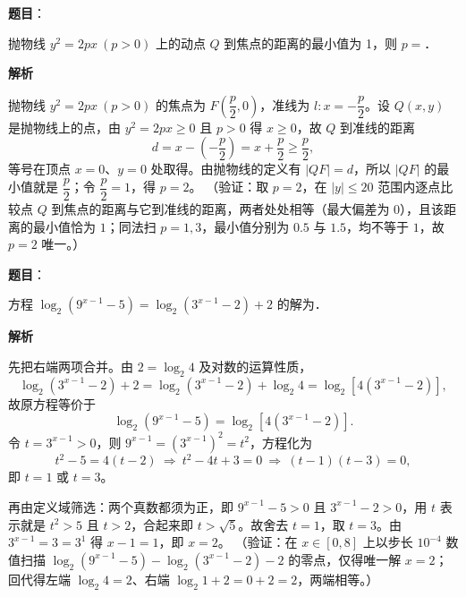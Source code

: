 \begin{answer}

\textbf{题目}：

抛物线 \(y^{2}=2px\ (p>0)\) 上的动点 \(Q\) 到焦点的距离的最小值为 1，则 \(p=\)\gkblank{}．

\textbf{解析}

抛物线 \(y^{2}=2px\ (p>0)\) 的焦点为 \(F\left(\dfrac{p}{2},0\right)\)，准线为 \(l:x=-\dfrac{p}{2}\)。设 \(Q(x,y)\) 是抛物线上的点，由 \(y^{2}=2px\geqslant0\) 且 \(p>0\) 得 \(x\geqslant0\)，故 \(Q\) 到准线的距离
\nopagebreak[4]
\[
d=x-\left(-\frac{p}{2}\right)=x+\frac{p}{2}\geqslant\frac{p}{2},
\]
等号在顶点 \(x=0\)、\(y=0\) 处取得。由抛物线的定义有 \(|QF|=d\)，所以 \(|QF|\) 的最小值就是 \(\dfrac{p}{2}\)；令 \(\dfrac{p}{2}=1\)，得 \(p=2\)。
（验证：取 \(p=2\)，在 \(|y|\leqslant20\) 范围内逐点比较点 \(Q\) 到焦点的距离与它到准线的距离，两者处处相等（最大偏差为 \(0\)），且该距离的最小值恰为 \(1\)；同法扫 \(p=1,3\)，最小值分别为 \(0.5\) 与 \(1.5\)，均不等于 \(1\)，故 \(p=2\) 唯一。）


\end{answer}
\begin{answer}

\textbf{题目}：

方程 \(\log_{2}(9^{x-1}-5)=\log_{2}(3^{x-1}-2)+2\) 的解为\gkblank{}．

\textbf{解析}

先把右端两项合并。由 \(2=\log_{2}4\) 及对数的运算性质，
\nopagebreak[4]
\[
\log_{2}(3^{x-1}-2)+2=\log_{2}(3^{x-1}-2)+\log_{2}4=\log_{2}\left[4(3^{x-1}-2)\right],
\]
故原方程等价于
\nopagebreak[4]
\[
\log_{2}(9^{x-1}-5)=\log_{2}\left[4(3^{x-1}-2)\right].
\]
令 \(t=3^{x-1}>0\)，则 \(9^{x-1}=(3^{x-1})^{2}=t^{2}\)，方程化为
\nopagebreak[4]
\[
t^{2}-5=4(t-2)\ \Longrightarrow\ t^{2}-4t+3=0\ \Longrightarrow\ (t-1)(t-3)=0,
\]
即 \(t=1\) 或 \(t=3\)。

再由定义域筛选：两个真数都须为正，即 \(9^{x-1}-5>0\) 且 \(3^{x-1}-2>0\)，用 \(t\) 表示就是 \(t^{2}>5\) 且 \(t>2\)，合起来即 \(t>\sqrt{5}\)。故舍去 \(t=1\)，取 \(t=3\)。由 \(3^{x-1}=3=3^{1}\) 得 \(x-1=1\)，即 \(x=2\)。
（验证：在 \(x\in[0,8]\) 上以步长 \(10^{-4}\) 数值扫描 \(\log_{2}(9^{x-1}-5)-\log_{2}(3^{x-1}-2)-2\) 的零点，仅得唯一解 \(x=2\)；回代得左端 \(\log_{2}4=2\)、右端 \(\log_{2}1+2=0+2=2\)，两端相等。）


\end{answer}
